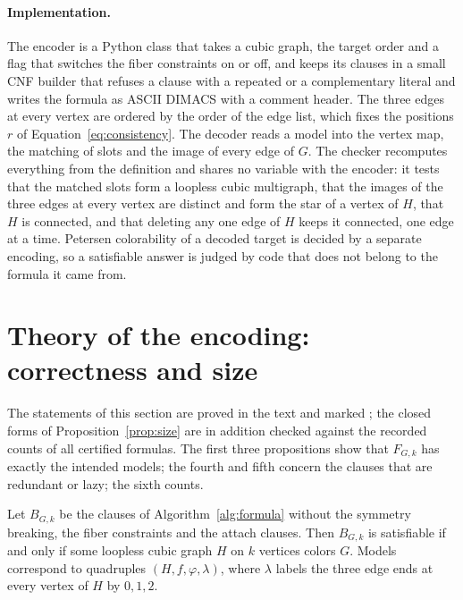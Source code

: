 \paragraph{Implementation.} The encoder is a Python class that takes a cubic graph, the target order and a flag that switches the fiber constraints on or off, and keeps its clauses in a small CNF builder that refuses a clause with a repeated or a complementary literal and writes the formula as ASCII DIMACS with a comment header. The three edges at every vertex are ordered by the order of the edge list, which fixes the positions $r$ of Equation~\eqref{eq:consistency}.
The decoder reads a model into the vertex map, the matching of slots and the image of every edge of $G$. The checker recomputes everything from the definition and shares no variable with the encoder: it tests that the matched slots form a loopless cubic multigraph, that the images of the three edges at every vertex are distinct and form the star of a vertex of $H$, that $H$ is connected, and that deleting any one edge of $H$ keeps it connected, one edge at a time.
Petersen colorability of a decoded target is decided by a separate encoding, so a satisfiable answer is judged by code that does not belong to the formula it came from.

\FloatBarrier
\section{Theory of the encoding: correctness and size}\label{sec:theory}

The statements of this section are proved in the text and marked \evD; the closed forms of Proposition~\ref{prop:size} are in addition checked against the recorded counts of all
certified formulas. The first three propositions show that $F_{G,k}$ has exactly the intended models; the fourth and fifth concern the clauses that are redundant or lazy; the sixth
counts.

\begin{proposition}\label{prop:base}
Let $B_{G,k}$ be the clauses of Algorithm~\ref{alg:formula} without the symmetry breaking, the fiber constraints and the attach clauses. Then $B_{G,k}$ is satisfiable if and only if some loopless cubic graph $H$ on $k$
vertices colors $G$. Models correspond to quadruples $(H, f, \varphi, \lambda)$, where $\lambda$ labels the three edge ends at every vertex of $H$ by $0, 1, 2$.
\end{proposition}

